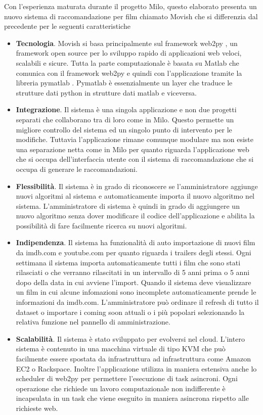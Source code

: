Con l'esperienza maturata durante il progetto Milo, questo elaborato presenta un nuovo sistema di raccomandazione per film chiamato Movish che si differenzia dal precedente per le seguenti caratteristiche
\begin{itemize}
\item \textbf{Tecnologia}. Movish si basa principalmente sul framework web2py \cite{web2py}, un framework open source per lo sviluppo rapido di applicazioni web veloci, scalabili e sicure. Tutta la parte computazionale \`e basata su Matlab \cite{matlab} che comunica con il framework web2py e quindi con l'applicazione tramite la libreria pymatlab \cite{pymatlab}. Pymatlab \`e essenzialmente un layer che traduce le strutture dati python in strutture dati matlab e viceversa.
\item \textbf{Integrazione}. Il sistema \`e una singola applicazione e non due progetti separati che collaborano tra di loro come in Milo. Questo permette un migliore controllo del sistema ed un singolo punto di intervento per le modifiche. Tuttavia l'applicazione rimane comunque modulare ma non esiste una separazione netta come in Milo per quanto riguarda l'applicazione web che si occupa dell'interfaccia utente con il sistema di raccomandazione che si occupa di generare le raccomandazioni.
\item \textbf{Flessibilit\`a}. Il sistema \`e in grado di riconoscere se l'amministratore aggiunge nuovi algoritmi al sistema e automaticamente importa il nuovo algoritmo nel sistema. L'amministratore di sistema \`e quindi in grado di aggiungere un nuovo algoritmo senza dover modificare il codice dell'applicazione e abilita la possibilit\`a di fare facilmente ricerca su nuovi algoritmi. 
\item \textbf{Indipendenza}. Il sistema ha funzionalit\`a di auto importazione di nuovi film da imdb.com e youtube.com per quanto riguarda i trailers degli stessi. Ogni settimana il sistema importa automaticamente tutti i film che sono stati rilasciati o che verranno rilascitati in un intervallo di 5 anni prima o 5 anni dopo della data in cui avviene l'import. Quando il sistema deve visualizzare un film in cui alcune infomazioni sono incomplete automaticamente prende le informazioni da imdb.com. L'amministratore pu\`o ordinare il refresh di tutto il dataset o importare i coming soon attuali o i pi\`u popolari selezionando la relativa funzione nel pannello di amministrazione.
\item \textbf{Scalabilit\`a}. Il sistema \`e stato sviluppato per evolversi nel cloud. L'intero sistema \`e contenuto in una macchina virtuale di tipo KVM che pu\`o facilmente essere spostata da infrastruttura ad infrastruttura come Amazon EC2 o Rackspace. Inoltre l'applicazione utilizza in maniera estensiva anche lo scheduler di web2py per permettere l'esecuzione di task asincroni. Ogni operazione che richiede un lavoro computazionale non indifferente \`e incapsulata in un task che viene eseguito in maniera asincrona rispetto alle richieste web.
\end{itemize}

